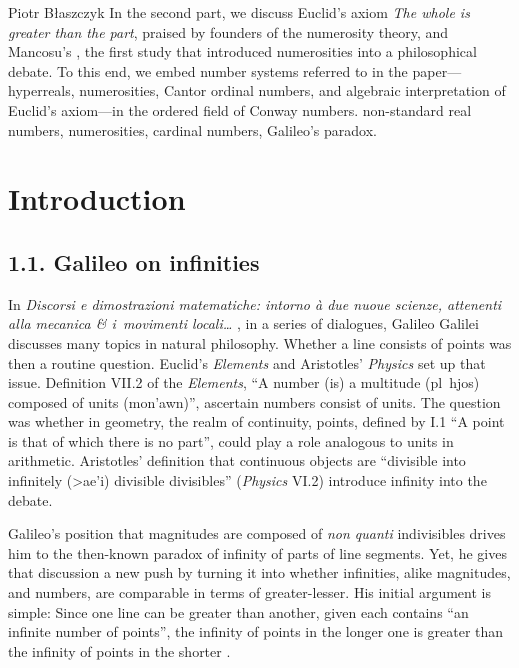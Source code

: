 \begin{artengenv}{Piotr Błaszczyk}
{	In the second part, we discuss  Euclid's axiom \textit{The whole is greater than the part},  praised by founders of the numerosity theory,  and  Mancosu's \parencite*{ref_pm09},  the first study that introduced numerosities into a philosophical debate.  To this end, we embed number systems referred to in the paper---hyperreals, numerosities, Cantor ordinal numbers, and algebraic interpretation of Euclid's axiom---in the ordered field of Conway numbers.}
	{non-standard real numbers, numerosities, cardinal numbers, Galileo's paradox.}






\section{Introduction}
\vspace*{-30pt}
\subsection{1.1. Galileo on infinities}
\lettrine[loversize=0.13,lines=2,lraise=-0.01,nindent=0em,findent=0.2pt]%
{I}{}n  \textit{Discorsi e dimostrazioni matematiche: intorno à due nuoue scienze, attenenti alla mecanica \& i~movimenti locali\ldots{}} \parencite*{ref_GG38}, in a series of dialogues, Galileo Galilei discusses many topics in natural philosophy.  Whether a line consists of  points was then a routine question. 
Euclid's \textit{Elements} and Aristotles' \textit{Physics} set up that issue.  
Definition VII.2 of the \textit{Elements}, ``A number (is) a multitude 
(\foreignlanguage{polutonikogreek}{pl~hjos}) composed of units (\foreignlanguage{polutonikogreek}{mon'awn})'', ascertain numbers consist of units.  
The question was whether in geometry, the realm of continuity, points, defined by  I.1 ``A point is that of which there is no part'', could play a role analogous to units in arithmetic.
 Aristotles'  definition that  continuous objects are ``divisible into  infinitely (\foreignlanguage{polutonikogreek}{>ae'i}) divisible divisibles'' (\textit{Physics} VI.2) introduce infinity into the debate.


Galileo's position that magnitudes are composed of  \textit{non quanti} indivisibles drives him to the then-known paradox of infinity of parts of line segments. Yet, he
gives that discussion  a new push
by turning it into whether infinities, alike magnitudes, and numbers, are comparable in terms of greater-lesser.
His initial argument is simple:
Since one line can be greater than another, given each contains ``an infinite number of points'',  the infinity of points in the longer one is greater than the infinity of points in the shorter \parencite[see][30--33]{ref_GG56}. 


\end{artengenv}
